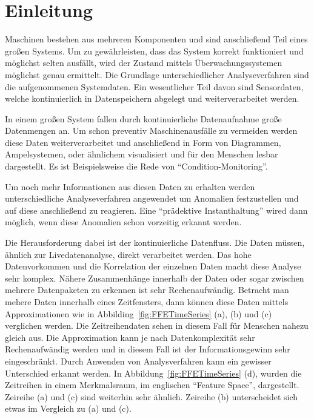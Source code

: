 \section{Einleitung}\label{kap:einleitung}

Maschinen bestehen aus mehreren Komponenten und sind anschließend Teil eines großen Systems.
Um zu gewährleisten, dass das System korrekt funktioniert und möglichst selten ausfällt, wird der Zustand mittels Überwachungssystemen möglichst genau ermittelt.
Die Grundlage unterschiedlicher Analyseverfahren sind die aufgenommenen Systemdaten.
Ein wesentlicher Teil davon sind Sensordaten, welche kontinuierlich in Datenspeichern abgelegt und weiterverarbeitet werden.

In einem großen System fallen durch kontinuierliche Datenaufnahme große Datenmengen an.
Um schon preventiv Maschinenausfälle zu vermeiden werden diese Daten weiterverarbeitet und anschließend in Form von Diagrammen, Ampelsystemen, oder ähnlichem visualisiert und für den Menschen lesbar dargestellt.
Es ist Beispielsweise die Rede von \enquote{Condition-Monitoring}. 

Um noch mehr Informationen aus diesen Daten zu erhalten werden unterschiedliche Analyseverfahren angewendet um Anomalien festzustellen und auf diese anschließend zu reagieren.
Eine \enquote{prädektive Instanthaltung} wired dann möglich, wenn diese Anomalien schon vorzeitig erkannt werden.

Die Herausforderung dabei ist der kontinuierliche Datenfluss.
Die Daten müssen, ähnlich zur Livedatenanalyse, direkt verarbeitet werden.
Das hohe Datenvorkommen und die Korrelation der einzelnen Daten macht diese Analyse sehr komplex.
Nähere Zusammenhänge innerhalb der Daten oder sogar zwischen mehrere Datenpaketen zu erkennen ist sehr Rechenaufwändig.
Betracht man mehere Daten innerhalb eines Zeitfensters, dann können diese Daten mittels Approximationen wie in Abbilding\ \ref{fig:FFETimeSeries} (a), (b) und (c) verglichen werden. 
Die Zeitreihendaten sehen in diesem Fall für Menschen nahezu gleich aus. 
Die Approximation kann je nach Datenkomplexität sehr Rechenaufwändig werden und in diesem Fall ist der Informationsgewinn sehr eingeschränkt.
Durch Anwenden von Analysverfahren kann ein gewisser Unterschied erkannt werden.
In Abbildung\ \ref{fig:FFETimeSeries} (d), wurden die Zeitreihen in einem Merkmalsraum, im englischen \enquote{Feature Space}, dargestellt. 
Zeireihe (a) und (c) sind weiterhin sehr ähnlich.
Zeireihe (b) unterscheidet sich etwas im Vergleich zu (a) und (c). 

